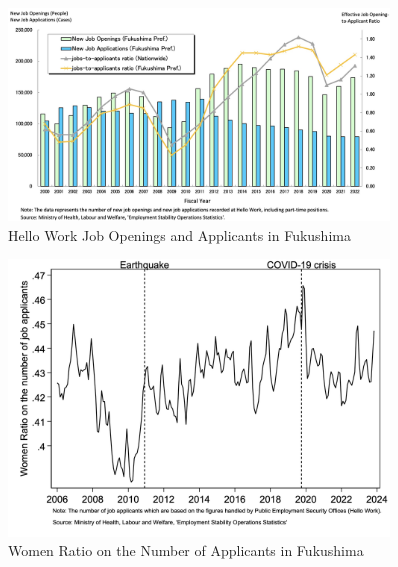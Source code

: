 \documentclass[a4paper,12pt]{article}
\begin{document}

\begin{figure}[h!]
    \centering
    \includegraphics[width=0.9\textwidth]{New Job Openings.jpeg}  %
    \caption{Hello Work Job Openings and Applicants in Fukushima}
    \label{fig:new_job_openings}
\end{figure}




\begin{figure}[h!]
    \centering
    \includegraphics[width=0.9\textwidth]{Women ratio on the number of job applicants.jpg}  %
    \caption{Women Ratio on the Number of Applicants in Fukushima}
    \label{fig:fukushima_Women_ratio_on_applicant}
\end{figure}
\end{document}
